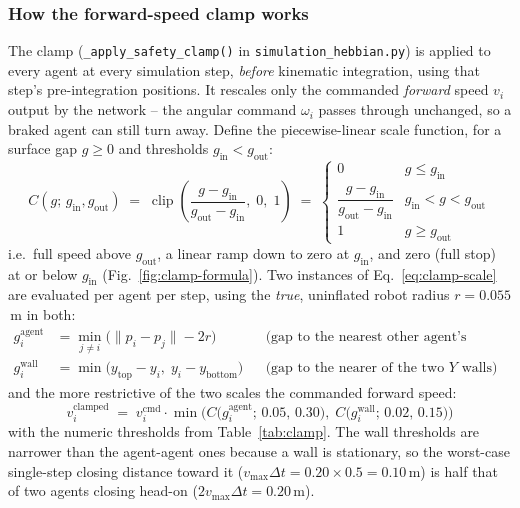 \documentclass[11pt]{article}
\begin{document}
\subsubsection{How the forward-speed clamp works}
\label{sec:clamp-formula}
The clamp (\texttt{\_apply\_safety\_clamp()} in \texttt{simulation\_hebbian.py}) is applied to
every agent at every simulation step, \emph{before} kinematic integration, using that step's
pre-integration positions. It rescales only the commanded \emph{forward} speed $v_i$ output by
the network -- the angular command $\omega_i$ passes through unchanged, so a braked agent can
still turn away. Define the piecewise-linear scale function, for a surface gap $g \geq 0$ and
thresholds $g_{\text{in}} < g_{\text{out}}$:
\begin{equation}
C(g;\, g_{\text{in}}, g_{\text{out}}) \;=\; \operatorname{clip}\!\left(\frac{g - g_{\text{in}}}{g_{\text{out}} - g_{\text{in}}},\; 0,\; 1\right)
\;=\;
\begin{cases}
0 & g \leq g_{\text{in}} \\[2pt]
\dfrac{g - g_{\text{in}}}{g_{\text{out}} - g_{\text{in}}} & g_{\text{in}} < g < g_{\text{out}} \\[6pt]
1 & g \geq g_{\text{out}}
\end{cases}
\label{eq:clamp-scale}
\end{equation}
i.e.\ full speed above $g_{\text{out}}$, a linear ramp down to zero at $g_{\text{in}}$, and zero
(full stop) at or below $g_{\text{in}}$ (Fig.~\ref{fig:clamp-formula}). Two instances of
Eq.~\ref{eq:clamp-scale} are evaluated per agent per step, using the \emph{true},
uninflated robot radius $r=0.055$\,m in both:
\begin{align}
g_i^{\text{agent}} &= \min_{j \neq i} \big(\lVert p_i - p_j \rVert - 2r\big)
&&\text{(gap to the nearest other agent's surface)} \\
g_i^{\text{wall}} &= \min\big(y_{\text{top}} - y_i,\; y_i - y_{\text{bottom}}\big)
&&\text{(gap to the nearer of the two $Y$ walls)}
\end{align}
and the more restrictive of the two scales the commanded forward speed:
\begin{equation}
v_i^{\text{clamped}} \;=\; v_i^{\text{cmd}} \cdot \min\Big(
C\big(g_i^{\text{agent}};\, 0.05,\, 0.30\big),\;
C\big(g_i^{\text{wall}};\, 0.02,\, 0.15\big)
\Big)
\label{eq:clamp-combined}
\end{equation}
with the numeric thresholds from Table~\ref{tab:clamp}. The wall thresholds are narrower than
the agent-agent ones because a wall is stationary, so the worst-case single-step closing
distance toward it ($v_{\max}\Delta t = 0.20 \times 0.5 = 0.10$\,m) is half that of two agents
closing head-on ($2 v_{\max}\Delta t = 0.20$\,m).
\end{document}
